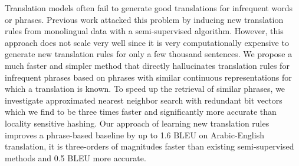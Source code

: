 Translation models often fail to generate good translations for infrequent words or phrases. Previous work attacked this problem by inducing new translation rules from monolingual data with a semi-supervised algorithm. However, this approach does not scale very well since it is very computationally expensive to generate new translation rules for only a few thousand sentences. We propose a much faster and simpler method that directly hallucinates translation rules for infrequent phrases based on phrases with similar continuous representations for which a translation is known. To speed up the retrieval of similar phrases, we investigate approximated nearest neighbor search with redundant bit vectors which we find to be three times faster and significantly more accurate than locality sensitive hashing. Our approach of learning new translation rules improves a phrase-based baseline by up to 1.6 BLEU on Arabic-English translation, it is three-orders of magnitudes faster than existing semi-supervised methods and 0.5 BLEU more accurate.
